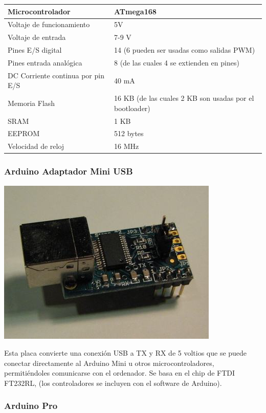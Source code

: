 \documentclass[12pt,a4paper]{report}
\begin{document}
\begin{tabular}{||l | l ||}
\hline
\hline
Microcontrolador & ATmega168\\
\hline
Voltaje de funcionamiento & 5V\\
\hline
Voltaje de entrada & 7-9 V\\
\hline
Pines E/S digital & 14 (6 pueden ser usadas como salidas PWM)\\
\hline
Pines entrada analógica & 8 (de las cuales 4 se extienden en pines)\\
\hline
DC Corriente continua por pin E/S & 40 mA\\
\hline
Memoria Flash & 16 KB (de las cuales 2 KB son usadas por el bootloader)\\
\hline
SRAM & 1 KB\\
\hline
EEPROM & 512 bytes\\
\hline
Velocidad de reloj & 16 MHz\\
\hline
\hline
\end{tabular}

\subsubsection{Arduino Adaptador Mini USB}

\includegraphics[scale=0.6]{mini_usb.jpg}

Esta placa convierte una conexión USB a TX y RX de 5 voltios que se puede
conectar directamente al Arduino Mini u otros microcontroladores, permitiéndoles
comunicarse con el ordenador. Se basa en el chip de FTDI FT232RL, (los
controladores se incluyen con el software de Arduino).

\subsubsection{Arduino Pro}
\end{document}
